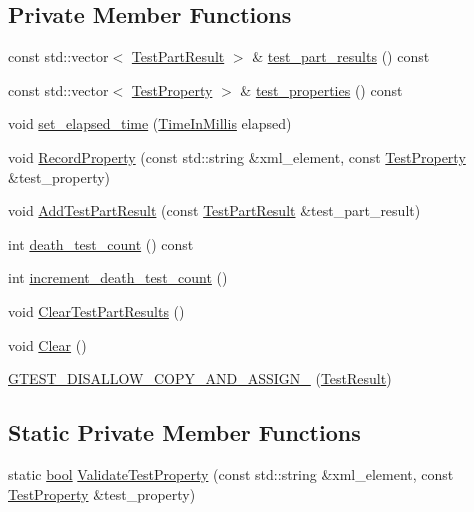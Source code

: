 \subsection*{Private Member Functions}
\begin{DoxyCompactItemize}
\item 
const std\+::vector$<$ \hyperlink{classtesting_1_1TestPartResult}{Test\+Part\+Result} $>$ \& \hyperlink{classtesting_1_1TestResult_a2964c3a12ef6ef9bcb47599374514432}{test\+\_\+part\+\_\+results} () const
\item 
const std\+::vector$<$ \hyperlink{classtesting_1_1TestProperty}{Test\+Property} $>$ \& \hyperlink{classtesting_1_1TestResult_a8c94e8e89c616abe5d33024a6b54f218}{test\+\_\+properties} () const
\item 
void \hyperlink{classtesting_1_1TestResult_aa345325e5dea41609d17d7c614bf2b18}{set\+\_\+elapsed\+\_\+time} (\hyperlink{namespacetesting_a992de1d091ce660f451d1e8b3ce30fd6}{Time\+In\+Millis} elapsed)
\item 
void \hyperlink{classtesting_1_1TestResult_ac253b0fd7ea70f457e9517e415eac32d}{Record\+Property} (const std\+::string \&xml\+\_\+element, const \hyperlink{classtesting_1_1TestProperty}{Test\+Property} \&test\+\_\+property)
\item 
void \hyperlink{classtesting_1_1TestResult_ac28e9821ad3e9314c4fe41b119c5b44d}{Add\+Test\+Part\+Result} (const \hyperlink{classtesting_1_1TestPartResult}{Test\+Part\+Result} \&test\+\_\+part\+\_\+result)
\item 
int \hyperlink{classtesting_1_1TestResult_a827cb78135ac375d81d89ffedc3eca52}{death\+\_\+test\+\_\+count} () const
\item 
int \hyperlink{classtesting_1_1TestResult_a07faaa1d16a991f34222d02e10c75dc2}{increment\+\_\+death\+\_\+test\+\_\+count} ()
\item 
void \hyperlink{classtesting_1_1TestResult_aa11ed718e0a76a39e6380e5ddce7cae2}{Clear\+Test\+Part\+Results} ()
\item 
void \hyperlink{classtesting_1_1TestResult_a5371bc2e69435b4cb1fdad9ca81759a6}{Clear} ()
\item 
\hyperlink{classtesting_1_1TestResult_ad04e1d5d9eb623ba1d9fc82cdff43af4}{G\+T\+E\+S\+T\+\_\+\+D\+I\+S\+A\+L\+L\+O\+W\+\_\+\+C\+O\+P\+Y\+\_\+\+A\+N\+D\+\_\+\+A\+S\+S\+I\+G\+N\+\_\+} (\hyperlink{classtesting_1_1TestResult}{Test\+Result})
\end{DoxyCompactItemize}
\subsection*{Static Private Member Functions}
\begin{DoxyCompactItemize}
\item 
static \hyperlink{classbool}{bool} \hyperlink{classtesting_1_1TestResult_a818c06cd2bfc00d6c81b0cebca044cb1}{Validate\+Test\+Property} (const std\+::string \&xml\+\_\+element, const \hyperlink{classtesting_1_1TestProperty}{Test\+Property} \&test\+\_\+property)
\end{DoxyCompactItemize}
